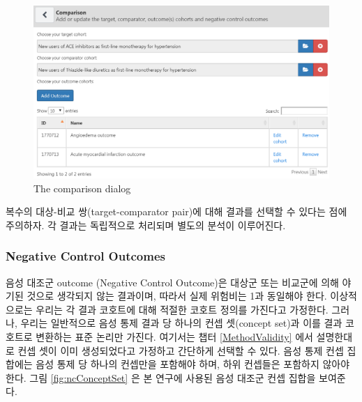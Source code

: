 \documentclass[11pt]{book}
\theoremstyle{definition}
\theoremstyle{definition}
\theoremstyle{definition}
\theoremstyle{remark}
\begin{document}
\begin{figure}

{\centering \includegraphics[width=1\linewidth]{images/PopulationLevelEstimation/comparisons} 

}

\caption{The comparison dialog}\label{fig:comparisons}
\end{figure}

복수의 대상-비교 쌍(target-comparator pair)에 대해 결과를 선택할 수
있다는 점에 주의하자. 각 결과는 독립적으로 처리되며 별도의 분석이
이루어진다.

\subsubsection*{Negative Control
Outcomes}\label{negative-control-outcomes}

음성 대조군 outcome (Negative Control Outcome)은 대상군 또는 비교군에
의해 야기된 것으로 생각되지 않는 결과이며, 따라서 실제 위험비는 1과
동일해야 한다. 이상적으로는 우리는 각 결과 코호트에 대해 적절한 코호트
정의를 가진다고 가정한다. 그러나, 우리는 일반적으로 음성 통제 결과 당
하나의 컨셉 셋(concept set)과 이를 결과 코호트로 변환하는 표준 논리만
가진다. 여기서는 챕터 \ref{MethodValidity} 에서 설명한대로 컨셉 셋이
이미 생성되었다고 가정하고 간단하게 선택할 수 있다. 음성 통제 컨셉
집합에는 음성 통제 당 하나의 컨셉만을 포함해야 하며, 하위 컨셉들은
포함하지 않아야 한다. 그림 \ref{fig:ncConceptSet} 은 본 연구에 사용된
음성 대조군 컨셉 집합을 보여준다.
\end{document}
